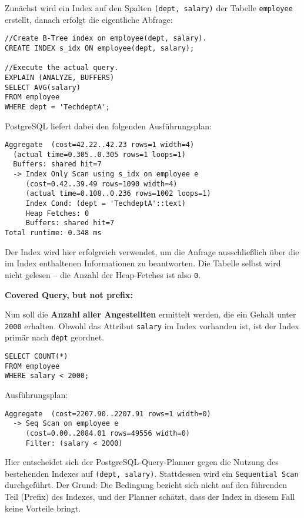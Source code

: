 \documentclass[11pt]{scrartcl}
\begin{document}
Zunächst wird ein Index auf den Spalten \texttt{(dept, salary)} der Tabelle \texttt{employee} erstellt, danach erfolgt die eigentliche Abfrage:

\begin{lstlisting}[style=dbtsql]
//Create B-Tree index on employee(dept, salary).
CREATE INDEX s_idx ON employee(dept, salary);

//Execute the actual query.
EXPLAIN (ANALYZE, BUFFERS)
SELECT AVG(salary)
FROM employee
WHERE dept = 'TechdeptA';
\end{lstlisting}

PostgreSQL liefert dabei den folgenden Ausführungsplan:

\begin{verbatim}
Aggregate  (cost=42.22..42.23 rows=1 width=4)
  (actual time=0.305..0.305 rows=1 loops=1)
  Buffers: shared hit=7
  -> Index Only Scan using s_idx on employee e 
     (cost=0.42..39.49 rows=1090 width=4)
     (actual time=0.108..0.236 rows=1002 loops=1)
     Index Cond: (dept = 'TechdeptA'::text)
     Heap Fetches: 0
     Buffers: shared hit=7
Total runtime: 0.348 ms
\end{verbatim}

Der Index wird hier erfolgreich verwendet, um die Anfrage ausschließlich über die im Index enthaltenen Informationen zu beantworten. Die Tabelle selbst wird nicht gelesen – die Anzahl der Heap-Fetches ist also \texttt{0}.

\vspace{0.5em}
\noindent\textbf{Covered Query, but not prefix:}

Nun soll die \textbf{Anzahl aller Angestellten} ermittelt werden, die ein Gehalt unter \texttt{2000} erhalten. Obwohl das Attribut \texttt{salary} im Index vorhanden ist, ist der Index primär nach \texttt{dept} geordnet.

\begin{lstlisting}[style=dbtsql]
SELECT COUNT(*)
FROM employee
WHERE salary < 2000;
\end{lstlisting}

Ausführungsplan:

\begin{verbatim}
Aggregate  (cost=2207.90..2207.91 rows=1 width=0)
  -> Seq Scan on employee e  
     (cost=0.00..2084.01 rows=49556 width=0)
     Filter: (salary < 2000)
\end{verbatim}

Hier entscheidet sich der PostgreSQL-Query-Planner gegen die Nutzung des bestehenden Indexes auf \texttt{(dept, salary)}. Stattdessen wird ein \texttt{Sequential Scan} durchgeführt. Der Grund: Die Bedingung bezieht sich nicht auf den führenden Teil (Prefix) des Indexes, und der Planner schätzt, dass der Index in diesem Fall keine Vorteile bringt.
\end{document}
